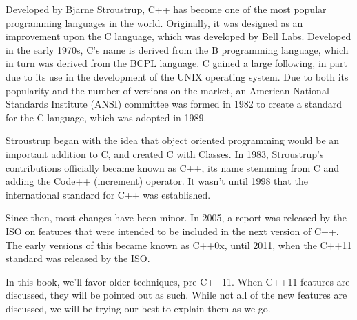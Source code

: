 
Developed by Bjarne Stroustrup, C++ has become one of the most popular programming languages in the world. 
Originally, it was designed as an improvement upon the C language, which was developed by Bell Labs. 
Developed in the early 1970s, C's name is derived from the B programming language, which in turn was derived from the BCPL language. 
C gained a large following, in part due to its use in the development of the UNIX operating system. 
Due to both its popularity and the number of versions on the market, an American National Standards Institute (ANSI) committee was formed in 1982 to create a standard for the C language, which was adopted in 1989.

Stroustrup began with the idea that object oriented programming would be an important addition to C, and created C with Classes.
In 1983, Stroustrup's contributions officially became known as C++, its name stemming from C and adding the Code{++} (increment) operator. 
It wasn't until 1998 that the international standard for C++ was established.

Since then, most changes have been minor. 
In 2005, a report was released by the ISO on features that were intended to be included in the next version of C++. 
The early versions of this became known as C++0x, until 2011, when the C++11 standard was released by the ISO.

In this book, we'll favor older techniques, pre-C++11. 
When C++11 features are discussed, they will be pointed out as such. 
While not all of the new features are discussed, we will be trying our best to explain them as we go.
